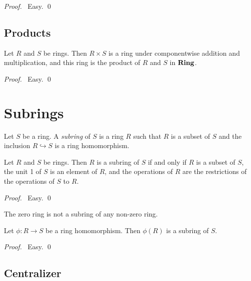 \begin{proof}
\pf\ Easy. \qed
\end{proof}
 
\section{Products}

\begin{prop}
Let $R$ and $S$ be rings. Then $R \times S$ is a ring under componentwise addition and multiplication, and this ring is the product of $R$ and $S$ in $\mathbf{Ring}$.
\end{prop}

\begin{proof}
\pf\ Easy. \qed
\end{proof}


\chapter{Subrings}

\begin{df}[Subring]
Let $S$ be a ring. A \emph{subring} of $S$ is a ring $R$ such that $R$ is a subset of $S$ and the inclusion $R \hookrightarrow S$ is a ring homomorphism.
\end{df}

\begin{prop}
Let $R$ and $S$ be rings. Then $R$ is a subring of $S$ if and only if $R$ is a subset of $S$, the unit 1 of $S$ is an element of $R$, and the operations of $R$ are the restrictions of the operations of $S$ to $R$.
\end{prop}

\begin{proof}
\pf\ Easy. \qed
\end{proof}

\begin{cor}
The zero ring is not a subring of any non-zero ring.
\end{cor}

\begin{prop}
Let $\phi : R \rightarrow S$ be a ring homomorphism. Then $\phi(R)$ is a subring of $S$.
\end{prop}

\begin{proof}
\pf\ Easy. \qed
\end{proof}

\section{Centralizer}

